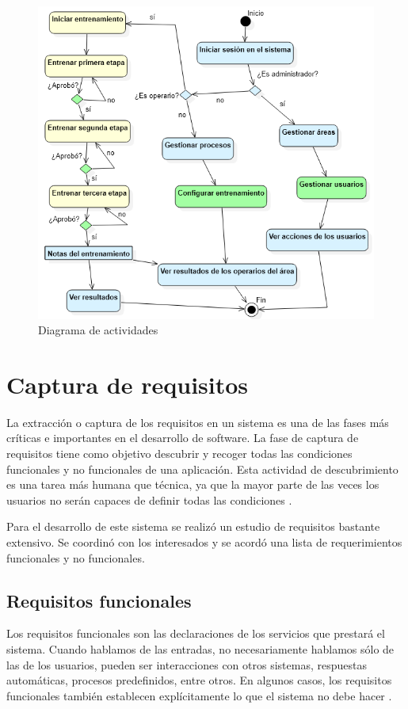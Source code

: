 \begin{figure}[h]
\centering
 \includegraphics[width=0.65\linewidth]{imagen/actividades.png}
 \caption{Diagrama de actividades}
 \label{fig:actividades} 
\end{figure} 


\section{Captura de requisitos}
La extracción o captura de los requisitos en un sistema es una de las fases más críticas e importantes en el desarrollo de software. La fase de captura de requisitos tiene como objetivo descubrir y recoger todas las condiciones funcionales y no funcionales de una aplicación. Esta actividad de descubrimiento es una tarea más humana que técnica, ya que la mayor parte de las veces los usuarios no serán capaces de definir todas las condiciones \cite{Dave2022}. 

Para el desarrollo de este sistema se realizó un estudio de requisitos bastante extensivo. Se coordinó con los interesados y se acordó una lista de requerimientos funcionales y no funcionales.

\subsection{Requisitos funcionales}
Los requisitos funcionales son las declaraciones de los servicios que prestará el sistema. Cuando hablamos de las entradas, no necesariamente hablamos sólo de las de los usuarios, pueden ser interacciones con otros sistemas, respuestas automáticas, procesos predefinidos, entre otros. En algunos casos, los requisitos funcionales también establecen explícitamente lo que el sistema no debe hacer \cite{Dave2022}.

